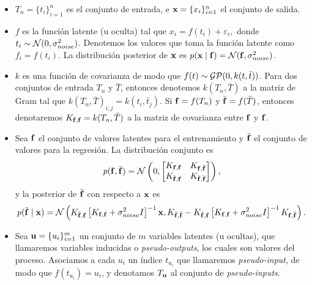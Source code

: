 \begin{itemize}
	\item \(T_{n} =\{t_{i}\}_{i=1}^{n}\) es el conjunto de entrada, e \(\mathbf{x} = \{x_{i}\}_{i=1}^{n}\) el conjunto de salida.
	\item \(f\) es la función latente (u oculta) tal que \(x_{i} = f(t_{i}) + \varepsilon_{i},\) donde \(t_{i} \sim \mathcal{N}(0, \sigma_{noise}^{2})\). Denotemos los valores que toma la función latente como \(f_{i} = f(t_{i})\). La distribución posterior de \(\mathbf{x}\) es \(p(\mathbf{x} \mid \mathbf{f}) = \mathcal{N}(\mathbf{f}, \sigma_{noise}^{2})\).
	\item \(k\) es una función de covarianza de modo que \(f(t) \sim \operatorname{\mathcal{GP}}(0, k(t, \bar{t}))\). Para dos conjuntos de entrada \(T_{n}\) y \(\bar{T}\), entonces denotemos \(k(T_{n}, \bar{T})\) a la matriz de Gram tal que \(k(T_{n}, \bar{T})_{i,j} = k(t_{i}, \bar{t}_{j})\). Si \(\mathbf{f} = f(T_{n})\) y \(\bar{\mathbf{f}} = f(\bar{T})\), entonces denotaremos \(K_{\mathbf{f}, \mathbf{f}} = k(T_{n}, \bar{T})\) a la matriz de covarianza entre \(\mathbf{f}\) y \(\mathbf{f}\).
	\item Sea \(\mathbf{f}\) el conjunto de valores latentes para el entrenamiento y \(\bar{\mathbf{f}}\) el conjunto de valores para la regresión. La distribución conjunto es
	\[p(\mathbf{f}, \bar{\mathbf{f}}) = \mathcal{N} \left(0, \begin{bmatrix}
		K_{\mathbf{f},\mathbf{f}} & K_{\mathbf{f},\bar{\mathbf{f}}} \\
		K_{\bar{\mathbf{f}},\mathbf{f}} & K_{\bar{\mathbf{f}},\bar{\mathbf{f}}}
	\end{bmatrix}
	\right),\]
	y la posterior de \(\bar{\mathbf{f}}\) con respecto a \(\mathbf{x}\) es
	\begin{equation*}
	p(\bar{\mathbf{f}} \mid \mathbf{x}) = \mathcal{N}\left(K_{\bar{\mathbf{f}}, \mathbf{f}} \left[K_{\mathbf{f}, \mathbf{f}} + \sigma_{noise}^{2} I\right]^{-1} \mathbf{x}, K_{\bar{\mathbf{f}}, \bar{\mathbf{f}}} - K_{\bar{\mathbf{f}}, \mathbf{f}} \left[K_{\mathbf{f}, \mathbf{f}} + \sigma_{noise}^{2} I\right]^{-1} K_{\mathbf{f}, \bar{\mathbf{f}}}\right).
	\end{equation*}
	\item Sea \(\mathbf{u} = \{u_{i}\}_{i=1}^{m}\) un conjunto de \(m\) variables latentes (u ocultas), que llamaremos variables inducidas o \emph{pseudo-outputs}, los cuales son valores del proceso. Asociamos a cada \(u_{i}\) un índice \(t_{u_{i}}\) que llamaremos \emph{pseudo-input}, de modo que \(f(t_{u_{i}}) = u_{i}\), y denotamos \(T_{\mathbf{u}}\) al conjunto de \emph{pseudo-inputs}.
\end{itemize}

